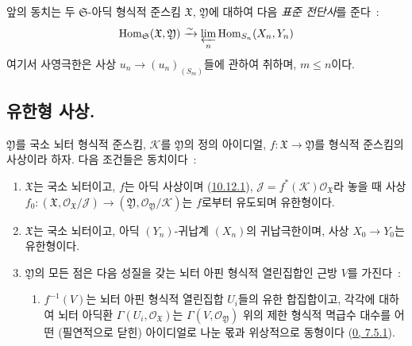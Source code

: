 \begin{env}[10.12.3.2]
\label{I.10.12.3.2-ko}
앞의 동치는 두 $\mathfrak{S}$-아딕 형식적 준스킴
$\mathfrak{X}$, $\mathfrak{Y}$에 대하여 다음 \emph{표준 전단사}를 준다~:
\[
  \operatorname{Hom}_{\mathfrak{S}}(\mathfrak{X},\mathfrak{Y})
  \xrightarrow{\sim}
  \varprojlim_n\operatorname{Hom}_{S_n}(X_n,Y_n)
\]
여기서 사영극한은 사상 $u_n\to(u_n)_{(S_m)}$들에 관하여 취하며,
$m\leq n$이다.
\end{env}

\subsection{유한형 사상.}
\label{subsection:I.10.13-ko}

\begin{proposition}[10.13.1]
\label{I.10.13.1-ko}
$\mathfrak{Y}$를 국소 뇌터 형식적 준스킴,
$\mathscr{K}$를 $\mathfrak{Y}$의 정의 아이디얼,
$f:\mathfrak{X}\to\mathfrak{Y}$를 형식적 준스킴의 사상이라 하자. 다음
조건들은 동치이다~:
\begin{enumerate}
  \item[a)] $\mathfrak{X}$는 국소 뇌터이고, $f$는 아딕 사상이며
    (\hyperref[I.10.12.1-ko]{10.12.1}),
    $\mathscr{J}=f^*(\mathscr{K})\mathscr{O}_{\mathfrak{X}}$라 놓을 때
    사상 $f_0:(\mathfrak{X},\mathscr{O}_{\mathfrak{X}}/\mathscr{J})
    \to(\mathfrak{Y},\mathscr{O}_{\mathfrak{Y}}/\mathscr{K})$는 $f$로부터
    유도되며 유한형이다.
  \item[b)] $\mathfrak{X}$는 국소 뇌터이고, 아딕
    $(Y_n)$-귀납계 $(X_n)$의 귀납극한이며, 사상 $X_0\to Y_0$는
    유한형이다.


  \item[c)] $\mathfrak{Y}$의 모든 점은 다음 성질을 갖는 뇌터 아핀
    형식적 열린집합인 근방 $V$를 가진다~:
    \begin{enumerate}
      \item[(\textbf{Q})] $f^{-1}(V)$는 뇌터 아핀 형식적 열린집합
        $U_i$들의 유한 합집합이고, 각각에 대하여 뇌터 아딕환
        $\Gamma(U_i,\mathscr{O}_{\mathfrak{X}})$는
        $\Gamma(V,\mathscr{O}_{\mathfrak{Y}})$ 위의 제한 형식적 멱급수
        대수를 어떤 (필연적으로 닫힌) 아이디얼로 나눈 몫과 위상적으로
        동형이다 (\hyperref[0.7.5.1-ko]{0, 7.5.1}).
    \end{enumerate}
\end{enumerate}
\end{proposition}

